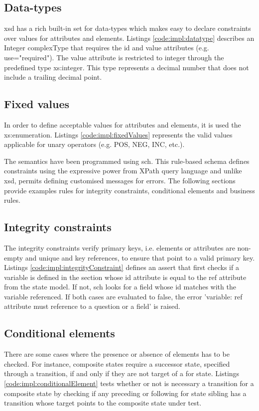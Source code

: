 	\subsection{Data-types}
		\gls{xsd} has a rich built-in set for data-types which makes easy to declare constraints over values for attributes and elements. Listings \ref{code:impl:datatype} describes an Integer complexType that requires the id and value attributes (e.g. use="required"). The value attribute is restricted to integer through the predefined type xs:integer. This type represents a decimal number that does not include a trailing decimal point.
		
	\subsection{Fixed values}
		In order to define acceptable values for attributes and elements, it is used the xs:enumeration. Listings \ref{code:impl:fixedValues} represents the valid values applicable for unary operators (e.g. POS, NEG, INC, etc.).
		

	The semantics have been programmed using \gls{sch}. This rule-based schema defines constraints using the expressive power from XPath query language and unlike \gls{xsd}, permits defining customised messages for errors. The following sections provide examples rules for integrity constraints, conditional elements and business rules.

	\subsection{Integrity constraints}
		The integrity constraints verify primary keys, i.e. elements or attributes are non-empty and unique and key references, to ensure that point to a valid primary key. Listings \ref{code:impl:integrityConstraint} defines an assert that first checks if a variable is defined in the section whose id attribute is equal to the ref attribute from the state model. If not, \gls{sch} looks for a field whose id matches with the variable referenced. If both cases are evaluated to false, the error 'variable: ref attribute must reference to a question or a field' is raised.
		
	\subsection{Conditional elements}
		There are some cases where the presence or absence of elements has to be checked. For instance, composite states require a successor state, specified through a transition, if and only if they are not target of a for state. Listings \ref{code:impl:conditionalElement} tests whether or not is necessary a transition for a composite state by checking if any preceding or following for state sibling has a transition whose target points to the composite state under test.
		
